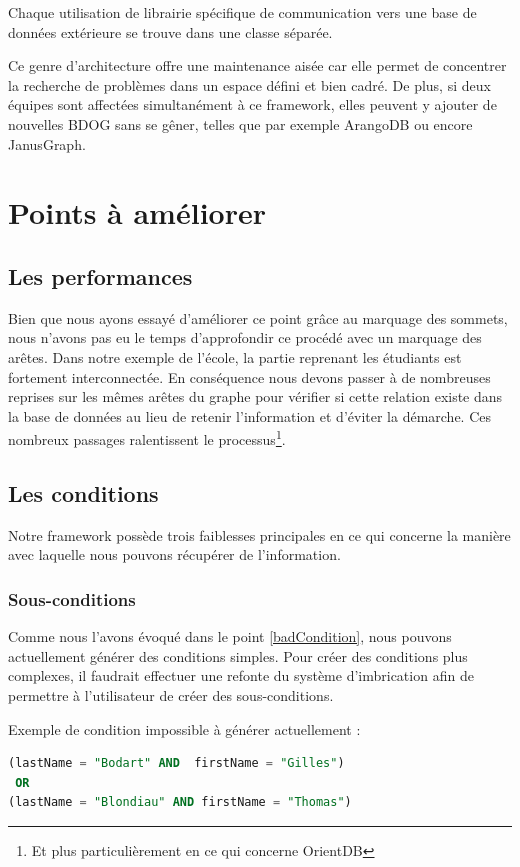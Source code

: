 \documentclass[a4paper,fleqn,12pt,oneside]{report}
\begin{document}
Chaque utilisation de librairie spécifique de communication vers une base de données extérieure se trouve dans une classe séparée.

Ce genre d'architecture offre une maintenance aisée car elle permet de concentrer la recherche de problèmes dans un espace défini et bien cadré. De plus, si deux équipes sont affectées simultanément à ce framework, elles peuvent y ajouter de nouvelles BDOG sans se gêner, telles que par exemple ArangoDB\cite{arangoSite} ou encore JanusGraph\cite{janusGraphSite}. 


\section{Points à améliorer}
\subsection{Les performances}

Bien que nous ayons essayé d'améliorer ce point grâce au marquage des sommets, nous n'avons pas eu le temps d'approfondir ce procédé avec un marquage des arêtes. Dans notre exemple de l'école, la partie reprenant les étudiants est fortement interconnectée. En conséquence nous devons passer à de nombreuses reprises sur les mêmes arêtes du graphe pour vérifier si cette relation existe dans la base de données au lieu de retenir l'information et d'éviter la démarche. Ces nombreux passages ralentissent le processus\footnote{Et plus particulièrement en ce qui concerne OrientDB}.

\subsection{Les conditions}

Notre framework possède trois faiblesses principales en ce qui concerne la manière avec laquelle nous pouvons récupérer de l'information.

\subsubsection*{\bf Sous-conditions}

Comme nous l'avons évoqué dans le point \ref{badCondition}, nous pouvons actuellement générer des conditions simples.
Pour créer des conditions plus complexes, il faudrait effectuer une refonte du système d'imbrication afin de permettre à l'utilisateur de créer des sous-conditions. 

Exemple de condition impossible à générer actuellement :
\begin{lstlisting}[language=SQL]
(lastName = "Bodart" AND  firstName = "Gilles") 
 OR 
(lastName = "Blondiau" AND firstName = "Thomas")
\end{lstlisting}
\end{document}
